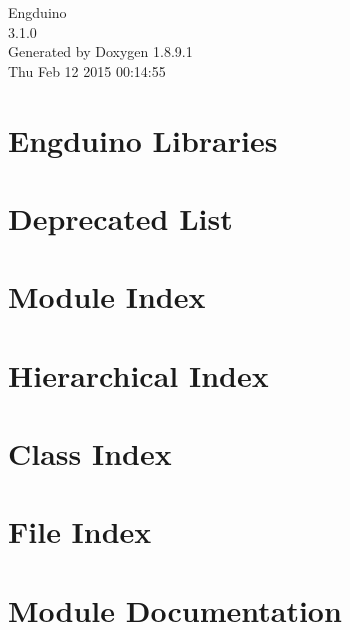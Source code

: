 \documentclass[twoside]{book}
\newcommand{\+}{\discretionary{\mbox{\scriptsize$\hookleftarrow$}}{}{}}
\newcommand{\clearemptydoublepage}{%
  \newpage{\pagestyle{empty}\cleardoublepage}%
}
\begin{document}
\hypersetup{pageanchor=false,
             bookmarks=true,
             bookmarksnumbered=true,
             pdfencoding=unicode
            }
\begin{titlepage}
\vspace*{7cm}
\begin{center}%
{\Large Engduino \\[1ex]\large 3.\+1.\+0 }\\
\vspace*{1cm}
{\large Generated by Doxygen 1.8.9.1}\\
\vspace*{0.5cm}
{\small Thu Feb 12 2015 00:14:55}\\
\end{center}
\end{titlepage}
\clearemptydoublepage
\tableofcontents
\clearemptydoublepage
{}
\hypersetup{pageanchor=true}

\chapter{Engduino Libraries}
\label{index}\hypertarget{index}{}
\chapter{Deprecated List}
\label{deprecated}
\hypertarget{deprecated}{}

\chapter{Module Index}

\chapter{Hierarchical Index}

\chapter{Class Index}

\chapter{File Index}

\chapter{Module Documentation}









\end{document}
